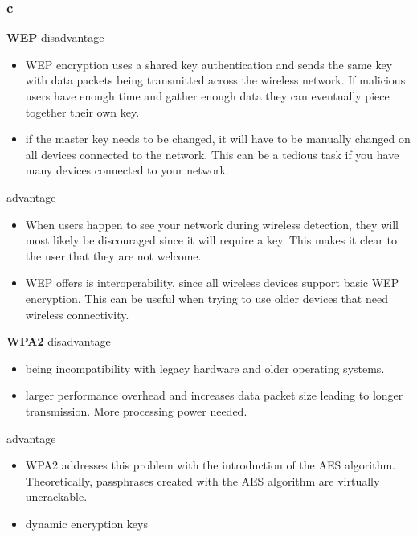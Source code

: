 \documentclass{article}
\begin{document}
    \subsubsection{c}
    \textbf{WEP}\newline
    disadvantage
    \begin{itemize}
        \item WEP encryption uses a shared key authentication and sends the same key with data packets being transmitted across the wireless network. If malicious users have enough time and gather enough data they can eventually piece together their own key.
        \item if the master key needs to be changed, it will have to be manually changed on all devices connected to the network. This can be a tedious task if you have many devices connected to your network.
    \end{itemize}
    advantage
    \begin{itemize}
        \item When users happen to see your network during wireless detection, they will most likely be discouraged since it will require a key. This makes it clear to the user that they are not welcome.
        \item  WEP offers is interoperability, since all wireless devices support basic WEP encryption. This can be useful when trying to use older devices that need wireless connectivity.
    \end{itemize}
    \textbf{WPA2}\newline
    disadvantage
    \begin{itemize}
        \item being incompatibility with legacy hardware and older operating systems.
        \item larger performance overhead and increases data packet size leading to longer transmission. More processing power needed.
    \end{itemize}
    advantage
    \begin{itemize}
        \item WPA2 addresses this problem with the introduction of the AES algorithm. Theoretically, passphrases created with the AES algorithm are virtually uncrackable.
         \item  dynamic encryption keys
    \end{itemize}
\end{document}
